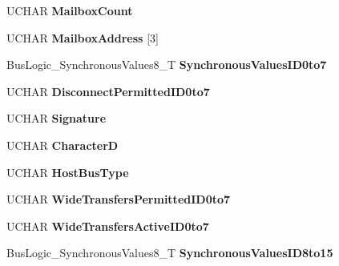 \begin{DoxyCompactItemize}
U\+C\+H\+AR {\bfseries Mailbox\+Count}
\item 
\mbox{\label{struct_bus_logic___setup_information_a74dfc4f5ba9f7ef46e66e8c67e7dab59}} 
U\+C\+H\+AR {\bfseries Mailbox\+Address} \mbox{[}3\mbox{]}
\item 
\mbox{\label{struct_bus_logic___setup_information_a36ea0abea0dd0cecf012602268589504}} 
Bus\+Logic\+\_\+\+Synchronous\+Values8\+\_\+T {\bfseries Synchronous\+Values\+I\+D0to7}
\item 
\mbox{\label{struct_bus_logic___setup_information_a630495eaddd87b95b5f646c1db12a346}} 
U\+C\+H\+AR {\bfseries Disconnect\+Permitted\+I\+D0to7}
\item 
\mbox{\label{struct_bus_logic___setup_information_a60305e908d1cc240b008599831730a37}} 
U\+C\+H\+AR {\bfseries Signature}
\item 
\mbox{\label{struct_bus_logic___setup_information_a5dc2272d1bb45ba660911b7c8f51a1ab}} 
U\+C\+H\+AR {\bfseries CharacterD}
\item 
\mbox{\label{struct_bus_logic___setup_information_a67306b197ef28699e7a2191f516704eb}} 
U\+C\+H\+AR {\bfseries Host\+Bus\+Type}
\item 
\mbox{\label{struct_bus_logic___setup_information_a06d47c6f051259790e0784c87720cb62}} 
U\+C\+H\+AR {\bfseries Wide\+Transfers\+Permitted\+I\+D0to7}
\item 
\mbox{\label{struct_bus_logic___setup_information_a2abf16098c55ec0371ed2d654514be42}} 
U\+C\+H\+AR {\bfseries Wide\+Transfers\+Active\+I\+D0to7}
\item 
\mbox{\label{struct_bus_logic___setup_information_a6d90eb5e7f7839cb74d069ae0537a0fe}} 
Bus\+Logic\+\_\+\+Synchronous\+Values8\+\_\+T {\bfseries Synchronous\+Values\+I\+D8to15}
\item 
\mbox{\label{struct_bus_logic___setup_information_aeed4bc6ebe522636f7e02d34c12873ba}} 

\end{DoxyCompactItemize}
